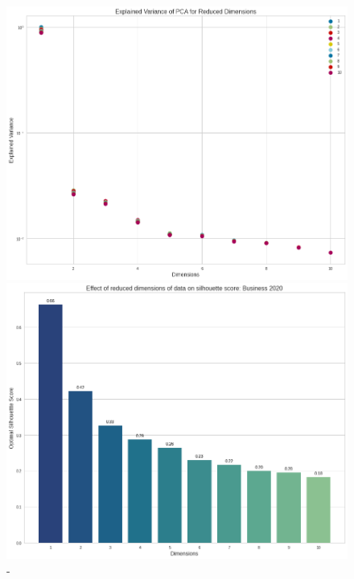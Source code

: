 \vspace{-2ex}
\begin{figure}[H]
  \centering
    \begin{minipage}[t]{.49\textwidth}
      \centering
      \includegraphics[width=\textwidth]{images/eval/explained_variances.png}
      \caption{-}
      \label{fig:explained_variance}
    \end{minipage}
    \begin{minipage}[t]{.49\textwidth}
      \centering
      \includegraphics[width=\textwidth]{images/eval/pca_silhouette.png}
      \caption{-}
      \label{fig:pca_sil}
    \end{minipage}
  \end{figure}



